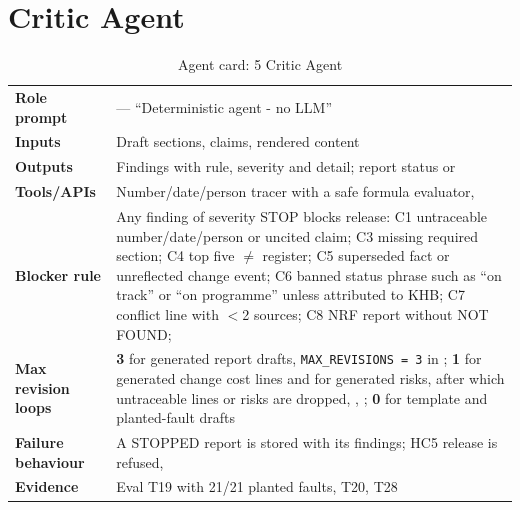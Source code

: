 \section{Critic Agent}
\begin{table}[H]
\centering\footnotesize
\caption{Agent card: 5 Critic Agent}
\label{tab:card-critic}
\begin{tabularx}{\textwidth}{>{\raggedright\arraybackslash}p{2.9cm}L}
\toprule
\textbf{Role prompt} &  --- ``Deterministic agent - no LLM'' \\
\textbf{Inputs} & Draft sections, claims, rendered content \\
\textbf{Outputs} & Findings with rule, severity and detail; report status  or  \\
\textbf{Tools/APIs} & Number/date/person tracer with a safe formula evaluator,  \\
\textbf{Blocker rule} & Any finding of severity STOP blocks release: C1 untraceable number/date/person or uncited claim; C3 missing required section; C4 top five $\neq$ register; C5 superseded fact or unreflected change event; C6 banned status phrase such as ``on track'' or ``on programme'' unless attributed to KHB; C7 conflict line with $<$2 sources; C8 NRF report without NOT FOUND;  \\
\textbf{Max revision loops} & \textbf{3} for generated report drafts, \texttt{MAX\_REVISIONS = 3} in ; \textbf{1} for generated change cost lines and for generated risks, after which untraceable lines or risks are dropped, , ; \textbf{0} for template and planted-fault drafts \\
\textbf{Failure behaviour} & A STOPPED report is stored with its findings; HC5 release is refused,  \\
\textbf{Evidence} & Eval T19 with 21/21 planted faults, T20, T28 \\
\bottomrule
\end{tabularx}
\end{table}

